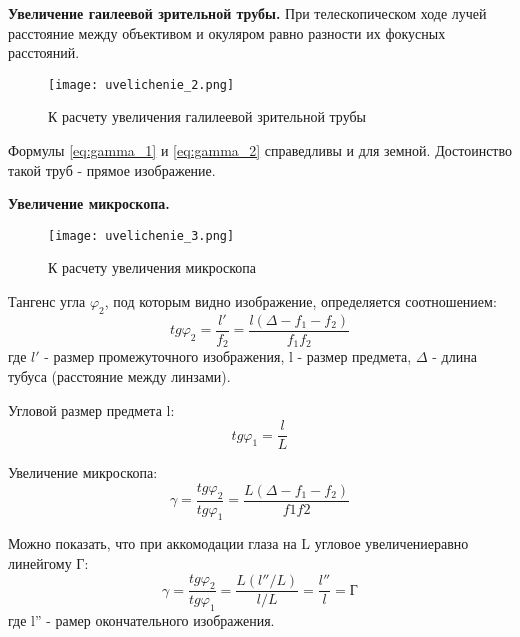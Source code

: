 \documentclass[12pt,a4paper]{article}
\begin{document}
\par
\textbf{Увеличение гаилеевой зрительной трубы.} При телескопическом ходе лучей расстояние между объективом и окуляром равно разности
их фокусных расстояний.

\begin{figure}[H]
    \begin{center}
    \texttt{[image: uvelichenie\_2.png]}
    \caption{ К расчету увеличения галилеевой зрительной трубы}
    \label{uvelichenie_2} %
    \end{center}
\end{figure}

Формулы \ref{eq:gamma_1} и \ref{eq:gamma_2} справедливы и для земной. Достоинство такой труб - прямое изображение.

\textbf{Увеличение микроскопа.} 

\begin{figure}[H]
    \begin{center}
    \texttt{[image: uvelichenie\_3.png]}
    \caption{ К расчету увеличения микроскопа}
    \label{uvelichenie_3} %
    \end{center}
\end{figure}

Тангенс угла $\varphi_2$, под которым видно изображение, определяется соотношением:
\begin{equation}
    tg\varphi_2 = \frac{l'}{f_2} = \frac{l(\Delta - f_1 - f_2)}{f_1f_2} \label{eq:tg}
\end{equation}
где $l'$ - размер промежуточного изображения, l - размер предмета, $\Delta$ - длина тубуса (расстояние между линзами).
\par
Угловой размер предмета l:
\begin{equation}
    tg\varphi_1 = \frac{l}{L} \label{eq:tg_2}
\end{equation}

\par
Увеличение микроскопа:
\begin{equation}
    \gamma = \frac{tg\varphi_2}{tg\varphi_1} = \frac{L(\Delta - f_1 - f_2)}{f1f2} \label{eq:gamma_3}
\end{equation}

Можно показать, что при аккомодации глаза на L угловое увеличениеравно линейгому Г:
\begin{equation}
    \gamma = \frac{tg\varphi_2}{tg\varphi_1} = \frac{L(l''/L)}{l/L} = \frac{l''}{l} = Г \label{eq:Gamma}
\end{equation}
где l'' - рамер окончательного изображения.
\end{document}
